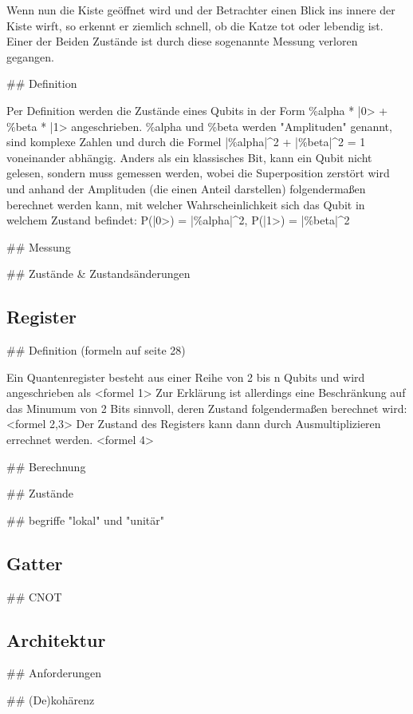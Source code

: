 Wenn nun die Kiste ge\"offnet wird und der Betrachter einen Blick ins innere der Kiste wirft, so erkennt er ziemlich schnell, ob die Katze tot oder lebendig ist. Einer der Beiden Zust\"ande ist durch diese sogenannte Messung verloren gegangen.

## Definition

Per Definition werden die Zust\"ande eines Qubits in der Form \%alpha * |0> + \%beta * |1> angeschrieben.
\%alpha und \%beta werden "Amplituden" genannt, sind komplexe Zahlen und durch die Formel |\%alpha|^2 + |\%beta|^2 = 1 voneinander abh\"angig.
Anders als ein klassisches Bit, kann ein Qubit nicht gelesen, sondern muss gemessen werden, wobei die Superposition zerst\"ort wird und anhand der Amplituden (die einen Anteil darstellen) folgendermaßen berechnet werden kann, mit welcher Wahrscheinlichkeit sich das Qubit in welchem Zustand befindet: P(|0>) = |\%alpha|^2, P(|1>) = |\%beta|^2

## Messung

## Zust\"ande & Zustands\"anderungen

\subsection{Register}
\label{sec:Register}

## Definition (formeln auf seite 28)

Ein Quantenregister besteht aus einer Reihe von 2 bis n Qubits und wird angeschrieben als <formel 1>
Zur Erkl\"arung ist allerdings eine Beschr\"ankung auf das Minumum von 2 Bits sinnvoll, deren Zustand folgendermaßen berechnet wird: <formel 2,3>
Der Zustand des Registers kann dann durch Ausmultiplizieren errechnet werden. <formel 4>

## Berechnung

## Zust\"ande

## begriffe "lokal" und "unit\"ar"


\subsection{Gatter}
\label{sec:Gatter}

## CNOT


\subsection{Architektur}
\label{sec:Architektur}

## Anforderungen

## (De)koh\"arenz

